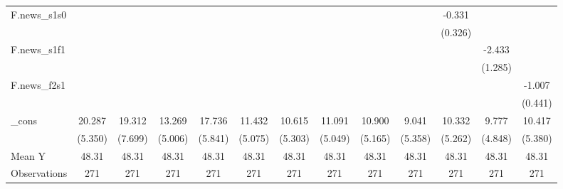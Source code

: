{\begin{tabular}{l*{12}{c}}
\addlinespace
F.news\_s1s0 &                     &                     &                     &                     &                     &                     &                     &                     &                     &      -0.331         &                     &                     \\
            &                     &                     &                     &                     &                     &                     &                     &                     &                     &     (0.326)         &                     &                     \\
\addlinespace
F.news\_s1f1 &                     &                     &                     &                     &                     &                     &                     &                     &                     &                     &      -2.433\sym{*}  &                     \\
            &                     &                     &                     &                     &                     &                     &                     &                     &                     &                     &     (1.285)         &                     \\
\addlinespace
F.news\_f2s1 &                     &                     &                     &                     &                     &                     &                     &                     &                     &                     &                     &      -1.007\sym{**} \\
            &                     &                     &                     &                     &                     &                     &                     &                     &                     &                     &                     &     (0.441)         \\
\addlinespace
\_cons      &      20.287\sym{***}&      19.312\sym{**} &      13.269\sym{**} &      17.736\sym{***}&      11.432\sym{**} &      10.615\sym{*}  &      11.091\sym{**} &      10.900\sym{**} &       9.041         &      10.332\sym{*}  &       9.777\sym{*}  &      10.417\sym{*}  \\
            &     (5.350)         &     (7.699)         &     (5.006)         &     (5.841)         &     (5.075)         &     (5.303)         &     (5.049)         &     (5.165)         &     (5.358)         &     (5.262)         &     (4.848)         &     (5.380)         \\
\midrule
Mean Y      &       48.31         &       48.31         &       48.31         &       48.31         &       48.31         &       48.31         &       48.31         &       48.31         &       48.31         &       48.31         &       48.31         &       48.31         \\
Observations&         271         &         271         &         271         &         271         &         271         &         271         &         271         &         271         &         271         &         271         &         271         &         271         \\
\bottomrule
\end{tabular}
}
